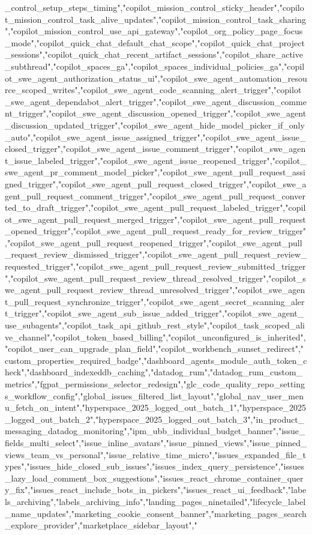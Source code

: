 _control_setup_steps_timing","copilot_mission_control_sticky_header","copilot_mission_control_task_alive_updates","copilot_mission_control_task_sharing","copilot_mission_control_use_api_gateway","copilot_org_policy_page_focus_mode","copilot_quick_chat_default_chat_scope","copilot_quick_chat_project_sessions","copilot_quick_chat_recent_artifact_sessions","copilot_share_active_subthread","copilot_spaces_ga","copilot_spaces_individual_policies_ga","copilot_swe_agent_authorization_status_ui","copilot_swe_agent_automation_resource_scoped_writes","copilot_swe_agent_code_scanning_alert_trigger","copilot_swe_agent_dependabot_alert_trigger","copilot_swe_agent_discussion_comment_trigger","copilot_swe_agent_discussion_opened_trigger","copilot_swe_agent_discussion_updated_trigger","copilot_swe_agent_hide_model_picker_if_only_auto","copilot_swe_agent_issue_assigned_trigger","copilot_swe_agent_issue_closed_trigger","copilot_swe_agent_issue_comment_trigger","copilot_swe_agent_issue_labeled_trigger","copilot_swe_agent_issue_reopened_trigger","copilot_swe_agent_pr_comment_model_picker","copilot_swe_agent_pull_request_assigned_trigger","copilot_swe_agent_pull_request_closed_trigger","copilot_swe_agent_pull_request_comment_trigger","copilot_swe_agent_pull_request_converted_to_draft_trigger","copilot_swe_agent_pull_request_labeled_trigger","copilot_swe_agent_pull_request_merged_trigger","copilot_swe_agent_pull_request_opened_trigger","copilot_swe_agent_pull_request_ready_for_review_trigger","copilot_swe_agent_pull_request_reopened_trigger","copilot_swe_agent_pull_request_review_dismissed_trigger","copilot_swe_agent_pull_request_review_requested_trigger","copilot_swe_agent_pull_request_review_submitted_trigger","copilot_swe_agent_pull_request_review_thread_resolved_trigger","copilot_swe_agent_pull_request_review_thread_unresolved_trigger","copilot_swe_agent_pull_request_synchronize_trigger","copilot_swe_agent_secret_scanning_alert_trigger","copilot_swe_agent_sub_issue_added_trigger","copilot_swe_agent_use_subagents","copilot_task_api_github_rest_style","copilot_task_scoped_alive_channel","copilot_token_based_billing","copilot_unconfigured_is_inherited","copilot_user_can_upgrade_plan_field","copilot_workbench_sunset_redirect","custom_properties_required_badge","dashboard_agents_module_auth_token_check","dashboard_indexeddb_caching","datadog_rum","datadog_rum_custom_metrics","fgpat_permissions_selector_redesign","glc_code_quality_repo_settings_workflow_config","global_issues_filtered_list_layout","global_nav_user_menu_fetch_on_intent","hyperspace_2025_logged_out_batch_1","hyperspace_2025_logged_out_batch_2","hyperspace_2025_logged_out_batch_3","in_product_messaging_datadog_monitoring","ipm_ubb_individual_budget_banner","issue_fields_multi_select","issue_inline_avatars","issue_pinned_views","issue_pinned_views_team_vs_personal","issue_relative_time_micro","issues_expanded_file_types","issues_hide_closed_sub_issues","issues_index_query_persistence","issues_lazy_load_comment_box_suggestions","issues_react_chrome_container_query_fix","issues_react_include_bots_in_pickers","issues_react_ui_feedback","labels_archiving","labels_archiving_info","landing_pages_ninetailed","lifecycle_label_name_updates","marketing_cookie_consent_banner","marketing_pages_search_explore_provider","marketplace_sidebar_layout","